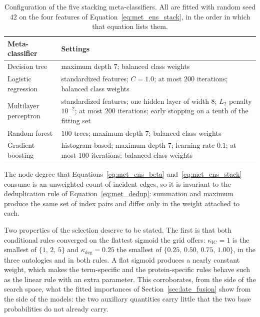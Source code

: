 \documentclass[Ingles]{ic-tese-v3}
\begin{document}
\begin{appendices}{}
\begin{table}[!htb]
  \centering
  \small
  \caption{Configuration of the five stacking meta-classifiers. All are fitted with random seed
  $42$ on the four features of Equation~\eqref{eq:met_ens_stack}, in the order in which that
  equation lists them.}
  \label{tab:ape_fusao_meta}
  \begin{tabular}{lp{9.2cm}}
    \hline
    \textbf{Meta-classifier} & \textbf{Settings} \\
    \hline
    Decision tree         & maximum depth $7$; balanced class weights \\
    Logistic regression   & standardized features; $C = 1.0$; at most $200$ iterations; balanced class weights \\
    Multilayer perceptron & standardized features; one hidden layer of width $8$; $L_2$ penalty $10^{-2}$; at most $200$ iterations; early stopping on a tenth of the fitting set \\
    Random forest         & $100$ trees; maximum depth $7$; balanced class weights \\
    Gradient boosting     & histogram-based; maximum depth $7$; learning rate $0.1$; at most $100$ iterations; balanced class weights \\
    \hline
  \end{tabular}
\end{table}

The node degree that Equations~\eqref{eq:met_ens_beta} and~\eqref{eq:met_ens_stack} consume is an
unweighted count of incident edges, so it is invariant to the deduplication rule of
Equation~\eqref{eq:met_dedup}: summation and maximum produce the same set of index pairs and differ
only in the weight attached to each.

Two properties of the selection deserve to be stated. The first is that both conditional rules
converged on the flattest sigmoid the grid offers: $\kappa_{\mathrm{IC}} = 1$ is the smallest of
$\{1,\,2,\,5\}$ and $\kappa_{\deg} = 0.25$ the smallest of $\{0.25,\,0.50,\,0.75,\,1.00\}$, in the
three ontologies and in both rules. A flat sigmoid produces a nearly constant weight, which makes
the term-specific and the protein-specific rules behave such as the linear rule with an extra
parameter. This corroborates, from the side of the search space, what the fitted importances of
Section~\ref{sec:late_fusion} show from the side of the models: the two auxiliary quantities carry
little that the two base probabilities do not already carry.


\end{appendices}
\end{document}
